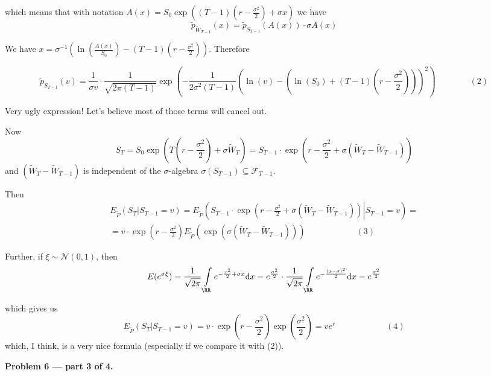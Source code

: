 \documentclass[12pt, a4paper]{article}
\newcommand{\cF}{\mathcal{F}}
\renewcommand{\FF}{\cF}
\newcommand{\ds}{\displaystyle}
\newcommand{\dx}{\mathrm{d}x}
\begin{document}
which means that with notation $A(x) = S_{0}\exp \left((T-1)\left(r - \frac{\ds \sigma^{2}}{\ds 2}\right) + \sigma x\right)$ we have
\[
\tilde{p}_{\tilde{W}_{T-1}}(x) = \tilde{p}_{S_{T-1}}\left(A(x)\right)\cdot \sigma A(x)
\]

We have $x = \sigma^{-1}\left(\ln\left(\frac{\ds A(x)}{\ds S_{0}}\right) - (T-1)\left(r - \frac{\ds \sigma^{2}}{\ds 2}\right)\right)$. Therefore

\[
 \tilde{p}_{S_{T-1}}\left(v\right) = \frac{\ds 1}{\ds \sigma v}\cdot \frac{\ds 1}{\ds \sqrt{2\pi (T-1)}}\exp\left(-\frac{\ds 1}{\ds 2\sigma^{2}(T-1)}\left(\ln(v) - \left(\ln(S_{0}) + (T-1)\left(r - \frac{\ds \sigma^{2}}{\ds 2}\right)\right)\right)^{2}\right) \qquad \qquad (2)
\]

Very ugly expression! Let's believe most of those terms will cancel out.

Now
\[
S_{T} = S_{0}\exp \left(T\left(r - \frac{\ds \sigma^{2}}{\ds 2}\right) + \sigma \tilde{W}_{T}\right) = S_{T-1}\cdot \exp\left(r - \frac{\ds \sigma^{2}}{\ds 2} + \sigma \left(\tilde{W}_{T} - \tilde{W}_{T-1}\right)\right)
\]
and $\left(\tilde{W}_{T} - \tilde{W}_{T-1}\right)$ is independent of the $\sigma$-algebra $\sigma(S_{T-1})\subseteq \FF_{T-1}$.


Then
\begin{multline}
 E_{\tilde{P}}\left(S_{T} | S_{T-1} = v\right) =  E_{\tilde{P}}\left(\left.S_{T-1}\cdot \exp\left(r - \frac{\ds \sigma^{2}}{\ds 2} + \sigma \left(\tilde{W}_{T} - \tilde{W}_{T-1}\right)\right) \right| S_{T-1} = v\right) =\\
 = v\cdot\exp\left(r - \frac{\ds \sigma^{2}}{\ds 2}\right) E_{\tilde{P}}\left(\exp\left(\sigma \left(\tilde{W}_{T} - \tilde{W}_{T-1}\right)\right)\right)\qquad\qquad\qquad (3)
\end{multline}


Further, if $\xi \sim \mathcal{N}(0,1)$, then
\[
E(e^{\sigma\xi}) = \frac{\ds 1}{\ds \sqrt{2\pi}}\int\limits_{\RR}e^{-\frac{x^{2}}{2} + \sigma x}\dx = e^{\frac{\sigma^{2}}{2}}\cdot\frac{\ds 1}{\ds \sqrt{2\pi}}\int\limits_{\RR}e^{-\frac{(x-\sigma)^{2}}{2}}\dx = e^{\frac{\sigma^{2}}{2}}
\]

which gives us
\[
E_{\tilde{P}}\left(S_{T} | S_{T-1} = v\right) = v\cdot\exp\left(r - \frac{\ds \sigma^{2}}{\ds 2}\right)\exp\left(\frac{\ds \sigma^{2}}{\ds 2}\right) = ve^{r}\qquad\qquad\qquad (4)
\]
which, I think, is a very nice formula (especially if we compare it with (2)).


\textbf{Problem 6 — part 3 of 4.}
\end{document}
